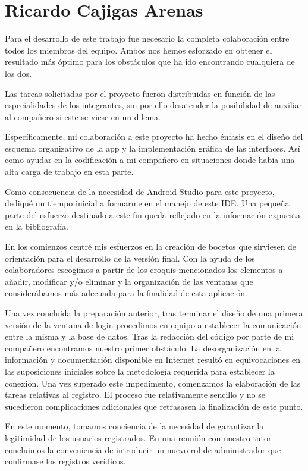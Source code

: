 \documentclass[11pt,spanish,
		listoftables,listoffigures]
		{tfgplantilla}
\begin{document}
\section{Ricardo Cajigas Arenas}
Para el desarrollo de este trabajo fue necesario la completa colaboración entre todos los miembros del equipo. Ambos nos hemos esforzado en obtener el resultado más óptimo para los obstáculos que ha ido encontrando cualquiera de los dos.

Las tareas solicitadas por el proyecto fueron distribuidas en función de las especialidades de los integrantes, sin por ello desatender la posibilidad de auxiliar al compañero si este se viese en un dilema.

Específicamente, mi colaboración a este proyecto ha hecho énfasis en el diseño del esquema organizativo de la app y la implementación gráfica de las interfaces. Así como ayudar en la codificación a mi compañero en situaciones donde había una alta carga de trabajo en esta parte.

Como consecuencia de la necesidad de Android Studio para este proyecto, dediqué un tiempo inicial a formarme en el manejo de este IDE. Una pequeña parte del esfuerzo destinado a este fin queda reflejado en la información expuesta en la bibliografía.

En los comienzos centré mis esfuerzos en la creación de bocetos que sirviesen de orientación para el desarrollo de la versión final. Con la ayuda de los colaboradores escogimos a partir de los croquis mencionados los elementos a añadir, modificar y/o eliminar y la organización de las ventanas que considerábamos más adecuada para la finalidad de esta aplicación.

Una vez concluida la preparación anterior, tras terminar el diseño de una primera versión de la ventana de login procedimos en equipo a establecer la comunicación entre la misma y la base de datos.
Tras la redacción del código por parte de mi compañero encontramos nuestro primer obstáculo. La desorganización en la información y documentación disponible en Internet resultó en equivocaciones en las suposiciones iniciales sobre la metodología requerida para establecer la conexión.
Una vez superado este impedimento, comenzamos la elaboración de las tareas relativas al registro. El proceso fue relativamente sencillo y no se sucedieron complicaciones adicionales que retrasasen la finalización de este punto.

En este momento, tomamos conciencia de la necesidad de garantizar la legitimidad de los usuarios registrados. En una reunión con nuestro tutor concluimos la conveniencia de introducir un nuevo rol de administrador que confirmase los registros verídicos. 
\end{document}
